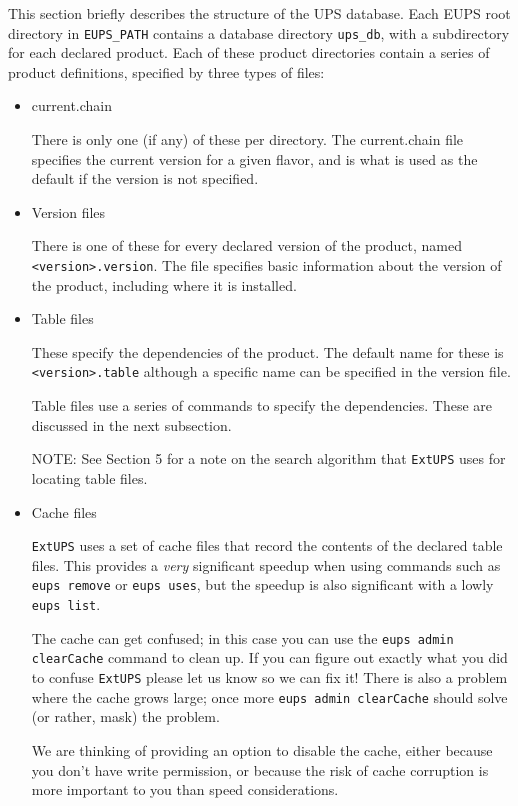 \documentclass{article}
\newcommand{\code}[1]{\texttt{#1}}
\newcommand{\file}[1]{\texttt{#1}}
\newcommand{\eups}{\code{ExtUPS}}
\begin{document}
This section briefly describes the structure of the UPS database. Each
EUPS root directory in \code{EUPS\_PATH} contains a database directory
\code{ups\_db}, with a subdirectory for each declared product.  Each
of these product directories contain a series of product definitions,
specified by three types of files:

\begin{itemize}
  \item current.chain

    There is only one (if any) of these per directory.  The
    current.chain file specifies the current version for a given
    flavor, and is what is used as the default if the version is not
    specified.

  \item Version files

    There is one of these for every declared version of the product,
    named \file{<version>.version}. The file specifies basic information
    about the version of the product, including where it is installed.

  \item Table files

    These specify the dependencies of the product. The default name
    for these is \file{<version>.table} although a specific name can be specified in the
    version file.

    Table files use a series of commands to specify the dependencies. These are
    discussed in the next subsection.

    NOTE: See Section 5 for a note on the search algorithm that \eups{} uses for 
    locating table files.

  \item Cache files

    \eups{} uses a set of cache files that record the contents of the declared
    table files.  This provides a \emph{very} significant speedup when using
    commands such as \code{eups remove} or \code{eups uses}, but the speedup
    is also significant with a lowly \code{eups list}.

    The cache can get confused; in this case you can use the \code{eups admin clearCache}
    command to clean up.  If you can figure out exactly what you did to confuse
    \eups{} please let us know so we can fix it!  There is also a problem where
    the cache grows large;  once more \code{eups admin clearCache} should
    solve (or rather, mask) the problem.

    We are thinking of providing an option to disable the cache, either because
    you don't have write permission, or because the risk of cache corruption is
    more important to you than speed considerations.

\end{itemize}
\end{document}
